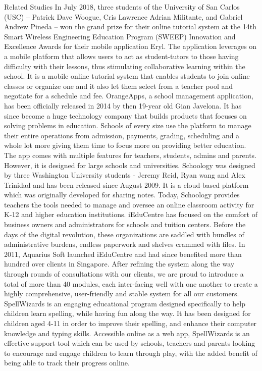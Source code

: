Related Studies
	In July 2018, three students of the University of San Carlos (USC) – Patrick Dave Woogue, Cris Lawrence Adrian Militante, and Gabriel Andrew Pineda – won the grand prize for their online tutorial system at the 14th Smart Wireless Engineering Education Program (SWEEP) Innovation and Excellence Awards for their mobile application Eryl. The application leverages on a mobile platform that allows users to act as student-tutors to those having difficulty with their lessons, thus stimulating collaborative learning within the school. It is a mobile online tutorial system that enables students to join online classes or organize one and it also let them select from a teacher pool and negotiate for a schedule and fee.
	OrangeApps, a school management application, has been officially released in 2014 by then 19-year old Gian Javelona. It has since become a huge technology company that builds products that focuses on solving problems in education. Schools of every size use the platform to manage their entire operations from admission, payments, grading, scheduling and a whole lot more giving them time to focus more on providing better education. The app comes with multiple features for teachers, students, admins and parents. However, it is designed for large schools and universities.
	Schoology was designed by three Washington University students - Jeremy Reid, Ryan wang and Alex Trinidad and has been released since August 2009. It is a cloud-based platform which was originally developed for sharing notes. Today, Schoology provides teachers the tools needed to manage and oversee an online classroom activity for K-12 and higher education institutions. 
	iEduCentre has focused on the comfort of business owners and administrators for schools and tuition centers. Before the days of the digital revolution, these organizations are saddled with bundles of administrative burdens, endless paperwork and shelves crammed with files. In 2011, Aquarius Soft launched iEduCentre and had since benefited more than hundred over clients in Singapore. After refining the system along the way through rounds of consultations with our clients, we are proud to introduce a total of more than 40 modules, each inter-facing well with one another to create a highly comprehensive, user-friendly and stable system for all our customers.
	SpellWizards is an engaging educational program designed specifically to help children learn spelling, while having fun along the way. It has been designed for children aged 4-11 in order to improve their spelling, and enhance their computer knowledge and typing skills. Accessible online as a web app, SpellWizards is an effective support tool which can be used by schools, teachers and parents looking to encourage and engage children to learn through play, with the added benefit of being able to track their progress online.

